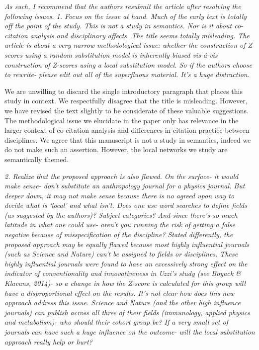 \documentclass[11pt, oneside]{article}   	%
\begin{document}
\emph{As such, I recommend that the authors resubmit the article after resolving the following issues. 1.  Focus on the issue at hand.  Much of the early text is totally off the point of the study. This is not a study in semantics. Nor is it about co-citation analysis and disciplinary affects. The title seems totally misleading. The article is about a very narrow methodological issue: whether the construction of Z-scores using a random substitution model is inherently biased vis-\'a-vis construction of Z-scores using a local substitution model.  So if the authors choose to rewrite- please edit out all of the superfluous material. It's a huge distraction.} 

We are unwilling to discard the single introductory paragraph that places this study in context. We respectfully disagree that the title is misleading. However, we have revised the text slightly to be considerate of these valuable suggestions. The methodological issue we elucidate in the paper only has relevance in the larger context of co-citation analysis and differences in citation practice between disciplines.  We agree that this manuscript is not a study in semantics, indeed we do not make such an assertion. However, the local networks we study are semantically themed.
 
\emph{2.  Realize that the proposed approach is also flawed.  On the surface- it would make sense- don't substitute an anthropology journal for a physics journal. But deeper down, it may not make sense because there is no agreed upon way to decide what is `local' and what isn't.  Does one use word searches to define fields (as suggested by the authors)?  Subject categories?  And since there's so much latitude in what one could use- aren't you running the risk of getting a false negative because of misspecification of the discipline?  Stated differently, the proposed approach may be equally flawed because most highly influential journals (such as Science and Nature) can't be assigned to fields or disciplines.   These highly influential journals were found to have an excessively strong effect on the indicator of conventionality and innovativeness in Uzzi's study (see Boyack \& Klavans, 2014)- so a change in how the Z-score is calculated for this group will have a disproportional effect on the results. It's not clear how does this new approach address this issue.  Science and Nature (and the other high influence journals) can publish across all three of their fields (immunology, applied physics and metabolism)- who should their cohort group be?  If a very small set of journals can have such a huge influence on the outcome- will the local substitution approach really help or hurt?}
\end{document}
